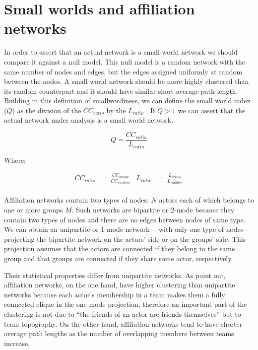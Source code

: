 \chapter{Small worlds and affiliation networks}
\label{sm-affnets}

In order to assert that an actual network is a small-world network we should compare it against a null model. This null model is a random network with the same number of nodes and edges, but the edges assigned uniformly at random between the nodes. A small world network should be more highly clustered than its random counterpart and it should have similar short average path length. Building in this definition of smallwordiness, we can define the small world index ($Q$) as the division of the $CC_{ratio}$ by the $L_{ratio}$ \citep{watts:1999b,davis:2003,uzzi:2005,uzzi:2007}. If $Q > 1$ we can assert that the actual network under analysis is a small world network.

\begin{equation}
Q = \frac{CC_{ratio}}{L_{ratio}}
\end{equation}

Where:

\begin{align}
CC_{ratio}& = \frac{CC_{actual}}{CC_{random}} &
L_{ratio}& = \frac{L_{actual}}{L_{random}} \nonumber \\
\end{align}

Affiliation networks contain two types of nodes: $N$ actors each of which belongs to one or more groups $M$. Such networks are bipartite or 2-mode because they contain two types of nodes and there are no edges between nodes of same type. We can obtain an unipartite or 1-mode network ---with only one type of nodes--- projecting the bipartite network on the actors' side or on the groups' side. This projection assumes that the actors are connected if they belong to the same group and that groups are connected if they share some actor, respectively.

Their statistical properties differ from unipartite networks. As \citet[83]{uzzi:2007} point out, affiliation networks, on the one hand, have higher clustering than unipartite networks because each actor's membership in a team makes them a fully connected clique in the one-mode projection, therefore an important part of the clustering is not due to ``the friends of an actor are friends themselves'' but to team topography. On the other hand, affiliation networks tend to have shorter average path lengths as the number of overlapping members between teams increase.

